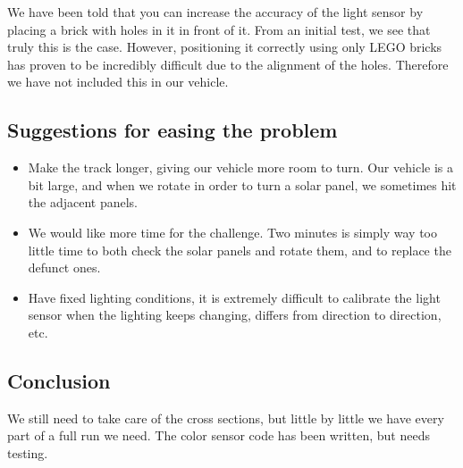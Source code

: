 We have been told that you can increase the accuracy of the light sensor
by placing a brick with holes in it in front of it. From an initial
test, we see that truly this is the case. However, positioning it
correctly using only LEGO bricks has proven to be incredibly difficult due to
the alignment of the holes. Therefore we have not included this in our
vehicle.

\subsection{Suggestions for easing the problem}

\begin{itemize}
\itemsep1pt\parskip0pt
\item
  Make the track longer, giving our vehicle more room to turn. Our
  vehicle is a bit large, and when we rotate in order to turn a solar
  panel, we sometimes hit the adjacent panels.
\item
  We would like more time for the challenge. Two minutes is simply way too
  little time to both check the solar panels and rotate them, and to replace
  the defunct ones.
\item
  Have fixed lighting conditions, it is extremely difficult to
  calibrate the light sensor when the lighting keeps changing, differs
  from direction to direction, etc.
\end{itemize}

\subsection{Conclusion}

We still need to take care of the cross sections, but little by little
we have every part of a full run we need. The color sensor code has been
written, but needs testing.
